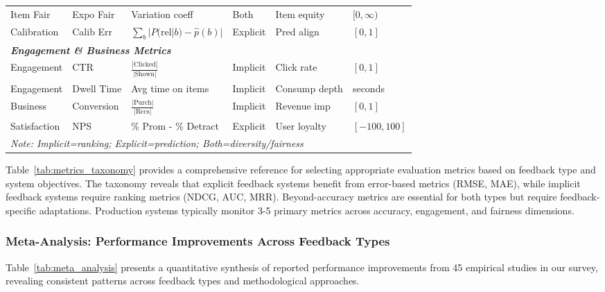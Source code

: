 \begin{table*}[ht]
\begin{tabular}{@{}p{2cm}p{2.2cm}p{2.8cm}p{1.4cm}p{2.4cm}p{1.1cm}@{}}
Item Fair & Expo Fair & Variation coeff & Both & Item equity & $[0, \infty)$ \\
Calibration & Calib Err & $\sum_b |P(\text{rel}|b) - \hat{p}(b)|$ & Explicit & Pred align & $[0, 1]$ \\
\midrule
\multicolumn{6}{l}{\textit{\textbf{Engagement \& Business Metrics}}} \\
\midrule
Engagement & CTR & $\frac{|\text{Clicked}|}{|\text{Shown}|}$ & Implicit & Click rate & $[0, 1]$ \\
Engagement & Dwell Time & Avg time on items & Implicit & Consump depth & seconds \\
Business & Conversion & $\frac{|\text{Purch}|}{|\text{Recs}|}$ & Implicit & Revenue imp & $[0, 1]$ \\
Satisfaction & NPS & \% Prom - \% Detract & Explicit & User loyalty & $[-100, 100]$ \\
\bottomrule
\multicolumn{6}{l}{\scriptsize \textit{Note: Implicit=ranking; Explicit=prediction; Both=diversity/fairness}} \\
\end{tabular}
\end{table*}

Table~\ref{tab:metrics_taxonomy} provides a comprehensive reference for selecting appropriate evaluation metrics based on feedback type and system objectives. The taxonomy reveals that explicit feedback systems benefit from error-based metrics (RMSE, MAE), while implicit feedback systems require ranking metrics (NDCG, AUC, MRR). Beyond-accuracy metrics are essential for both types but require feedback-specific adaptations. Production systems typically monitor 3-5 primary metrics across accuracy, engagement, and fairness dimensions.

\subsubsection{Meta-Analysis: Performance Improvements Across Feedback Types}

Table~\ref{tab:meta_analysis} presents a quantitative synthesis of reported performance improvements from 45 empirical studies in our survey, revealing consistent patterns across feedback types and methodological approaches.

